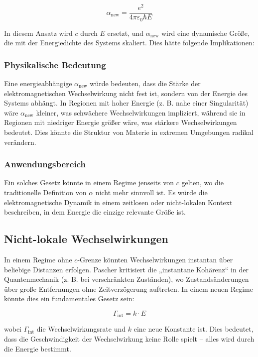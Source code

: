 \documentclass{article}
\begin{document}
	\[
	\alpha_{\text{new}} = \frac{e^2}{4\pi \varepsilon_0 \hbar E}
	\]
	
	In diesem Ansatz wird \( c \) durch \( E \) ersetzt, und \( \alpha_{\text{new}} \) wird eine dynamische Größe, die mit der Energiedichte des Systems skaliert. Dies hätte folgende Implikationen:
	
	\subsubsection{Physikalische Bedeutung}
	
	Eine energieabhängige \( \alpha_{\text{new}} \) würde bedeuten, dass die Stärke der elektromagnetischen Wechselwirkung nicht fest ist, sondern von der Energie des Systems abhängt. In Regionen mit hoher Energie (z. B. nahe einer Singularität) wäre \( \alpha_{\text{new}} \) kleiner, was schwächere Wechselwirkungen impliziert, während sie in Regionen mit niedriger Energie größer wäre, was stärkere Wechselwirkungen bedeutet. Dies könnte die Struktur von Materie in extremen Umgebungen radikal verändern.
	
	\subsubsection{Anwendungsbereich}
	
	Ein solches Gesetz könnte in einem Regime jenseits von \( c \) gelten, wo die traditionelle Definition von \( \alpha \) nicht mehr sinnvoll ist. Es würde die elektromagnetische Dynamik in einem zeitlosen oder nicht-lokalen Kontext beschreiben, in dem Energie die einzige relevante Größe ist.
	
	\subsection{Nicht-lokale Wechselwirkungen}
	
	In einem Regime ohne \( c \)-Grenze könnten Wechselwirkungen instantan über beliebige Distanzen erfolgen. Pascher kritisiert die „instantane Kohärenz“ in der Quantenmechanik (z. B. bei verschränkten Zuständen), wo Zustandsänderungen über große Entfernungen ohne Zeitverzögerung auftreten. In einem neuen Regime könnte dies ein fundamentales Gesetz sein:
	
	\[
	\Gamma_{\text{int}} = k \cdot E
	\]
	
	wobei \( \Gamma_{\text{int}} \) die Wechselwirkungsrate und \( k \) eine neue Konstante ist. Dies bedeutet, dass die Geschwindigkeit der Wechselwirkung keine Rolle spielt – alles wird durch die Energie bestimmt.
	
\end{document}
